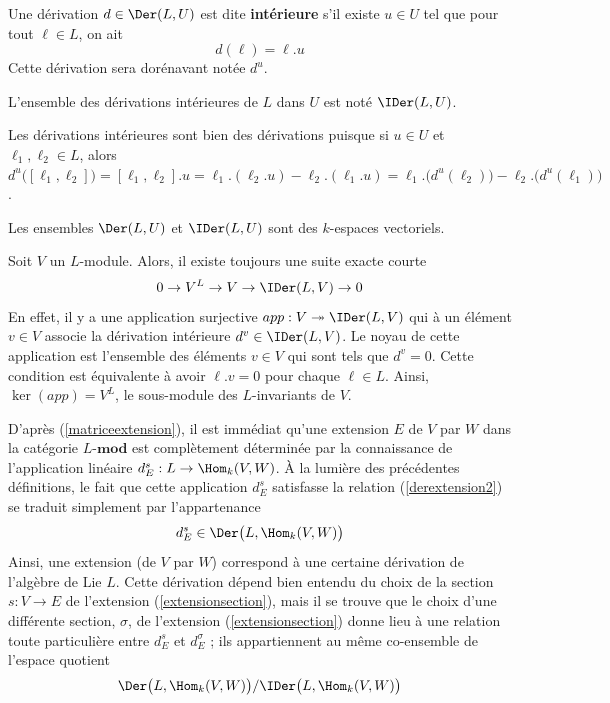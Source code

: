 \begin{Def} Une dérivation $d \in \Der(L,U)$ est dite \textbf{intérieure} s'il existe $u \in U$ tel que pour tout $\ell \in L$, on ait
$$ d(\ell) = \ell.u $$
Cette dérivation sera dorénavant notée $d^u$. 

L'ensemble des dérivations intérieures de $L$ dans $U$ est noté $\IDer(L,U)$.
\end{Def}

\begin{Rem} Les dérivations intérieures sont bien des dérivations puisque si $u \in U$ et $\ell_1, \ell_2 \in L$, alors $d^u\big([\ell_1,\ell_2]\big) = [\ell_1,\ell_2].u = \ell_1.(\ell_2.u) - \ell_2.(\ell_1.u) = \ell_1.\big(d^u(\ell_2)\big) - \ell_2.\big(d^u(\ell_1)\big)$.
\end{Rem}

\begin{Rem} Les ensembles $\Der(L,U)$ et $\IDer(L,U)$ sont des $k$-espaces vectoriels.
\end{Rem}

\begin{Rem} \label{seider} Soit $V$ un $L$-module. Alors, il existe toujours une suite exacte courte
$$ 0 \rightarrow V^L \rightarrow V \rightarrow \IDer(L,V) \rightarrow 0 $$
En effet, il y a une application surjective $app : V \twoheadrightarrow \IDer(L,V)$ qui à un élément $v \in V$ associe la dérivation intérieure $d^v \in \IDer(L,V)$. Le noyau de cette application est l'ensemble des éléments $v \in V$ qui sont tels que $d^v = 0$. Cette condition est équivalente à avoir $\ell.v = 0$ pour chaque $\ell \in L$. Ainsi, $\ker (app) = V^L$, le sous-module des $L$-invariants de $V$. 
\end{Rem}

D'après (\ref{matriceextension}), il est immédiat qu'une extension $E$ de $V$ par $W$ dans la catégorie $L$-$\mathbf{mod}$ est complètement déterminée par la connaissance de l'application linéaire $d_E^s : L \rightarrow \Hom_k(V,W)$. À la lumière des précédentes définitions, le fait que cette application $d_E^s$ satisfasse la relation (\ref{derextension2}) se traduit simplement par l'appartenance
$$ d_E^s \in \Der\big(L,\Hom_k(V,W)\big) $$
Ainsi, une extension (de $V$ par $W$) correspond à une certaine dérivation de l'algèbre de Lie $L$. Cette dérivation dépend bien entendu du choix de la section $s : V \rightarrow E$ de l'extension (\ref{extensionsection}), mais il se trouve que le choix d'une différente section, $\sigma$, de l'extension (\ref{extensionsection}) donne lieu à une relation toute particulière entre $d_E^s$ et $d_E^\sigma$ ; ils appartiennent au même co-ensemble de l'espace quotient
$$ \Der\big(L,\Hom_k(V,W)\big) / \IDer\big(L,\Hom_k(V,W)\big) $$

